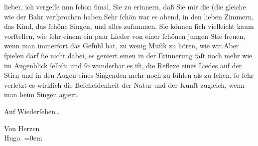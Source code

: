            \label{OL444-1v}\label{OL444-1h}lieber, ich vergeſſe nun{ }ſchon 6mal,  Sie zu erinnern, daß Sie mir die \label{K_L01319-1v}\label{K_L01319-1} (die gleiche wie der Bahr\label{T_L01319-1v}\label{T_L01319-1} verſprochen haben.\hspace*{1.5em}Sehr{ }ſchön war es \label{K_L01319-2v}\label{K_L01319-2} abend, in den lieben Zimmern, das Kind, das{ }ſchöne Singen, und alles zuſammen. Sie können{ }ſich vielleicht kaum vorſtellen, wie{ }ſehr einem ein paar Lieder von einer{ }ſchönen
               jungen Sti{\geminationm}e freuen, wenn {\pb}man immerfort das Gefühl hat, zu
               wenig Muſik zu hören, wie wir.\hspace*{1.5em}Aber{ }ſpielen darf{ }ſie
               nicht dabei, es geniert einen in der Erinnerung faſt noch mehr wie im Augenblick{ }ſelbſt: und{ }ſo wunderbar es iſt, die Reflexe eines Liedes auf der Stirn und in den
               Augen eines Singenden mehr noch zu fühlen als zu{ }ſehen,{ }ſo{ }ſehr {\pb}verletzt es wirklich die
               Beſcheidenheit der Natur und der Kunſt zugleich, wenn man beim Singen agiert.\pend
           
\pstart
           Auf Wiederſehen \label{K_L01319-3v}\label{K_L01319-3}.\pend
           
\pstart
           Von Herzen{\\[\baselineskip]}\spacefill\mbox{Hugo.}\pend
           \leftskip=0em{}\endnumbering{}  \newcommand{\dateiname}{L01319}\newcommand{\titel}{Hugo von Hofmannsthal an Arthur Schnitzler, 27. 9. [1903]}\newcommand{\editorInnen}{Kurt Ifkovits und Martin Anton Müller}
